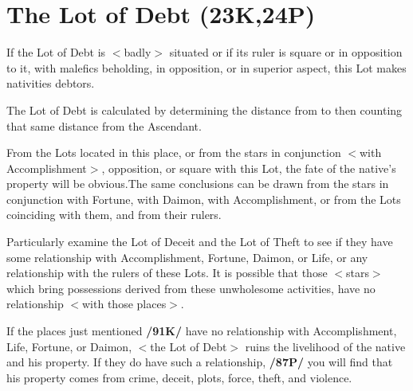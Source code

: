 \section{The Lot of Debt (23K,24P)}


If the Lot of Debt is $<$badly$>$ situated or if its ruler is square or in opposition to it, with malefics beholding, in opposition, or in superior aspect, this Lot makes nativities debtors. 

The Lot of Debt is calculated  by determining the distance from \Mercury\xspace to \Saturn\xspace then counting that same distance from the Ascendant. 

From the Lots located in this place, or from the stars in conjunction $<$with Accomplishment$>$, opposition, or square with this Lot, the fate of the native’s property will be obvious.\mndl The same conclusions can be drawn from the stars in conjunction with Fortune, with Daimon, with Accomplishment,
or from the Lots coinciding with them, and from their rulers.

Particularly examine the Lot of Deceit and the Lot of Theft to see if they have some relationship with Accomplishment, Fortune, Daimon, or Life, or any relationship with the rulers of these Lots. It is possible that those $<$stars$>$ which bring possessions derived from these unwholesome activities, have no relationship $<$with those places$>$. 

If the places just mentioned \textbf{/91K/} have no relationship with Accomplishment, Life, Fortune, or Daimon, $<$the Lot of Debt$>$ ruins the livelihood of the native and his property. If they do have such a relationship, \textbf{/87P/} you will find that his property comes from crime, deceit, plots, force, theft, and violence.

\newpage